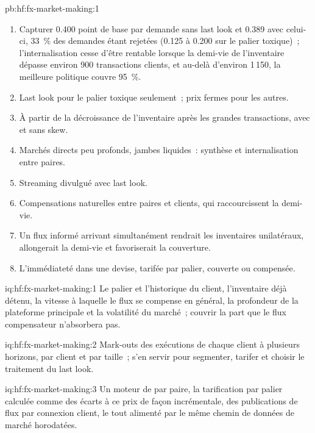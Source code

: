 \begin{solution}{pb:hf:fx-market-making:1}
\begin{enumerate}
\item Capturer 0.400 point de base par demande sans last look et 0.389 avec celui-ci, 33~\% des demandes étant rejetées (0.125 à 0.200 sur le palier toxique)~; l'internalisation cesse
d'être rentable lorsque la demi-vie de l'inventaire dépasse environ 900 transactions clients, et au-delà d'environ 1\,150, la meilleure politique couvre 95~\%.
\item Last look pour le palier toxique seulement~; prix fermes pour les autres.
\item À partir de la décroissance de l'inventaire après les grandes transactions, avec et sans skew.
\item Marchés directs peu profonds, jambes liquides~: synthèse et internalisation entre paires.
\item Streaming divulgué avec last look.
\item Compensations naturelles entre paires et clients, qui raccourcissent la demi-vie.
\item Un flux informé arrivant simultanément rendrait les inventaires unilatéraux, allongerait la demi-vie et favoriserait la couverture.
\item L'immédiateté dans une devise, tarifée par palier, couverte ou compensée.
\end{enumerate}
\end{solution}

\begin{solution}{iq:hf:fx-market-making:1}
Le palier et l'historique du client, l'inventaire déjà détenu, la vitesse à laquelle le flux se compense en général, la profondeur de la plateforme
principale et la volatilité du marché~; couvrir la part que le flux compensateur n'absorbera pas.
\end{solution}

\begin{solution}{iq:hf:fx-market-making:2}
Mark-outs des exécutions de chaque client à plusieurs horizons, par client et par taille~; s'en servir pour segmenter, tarifer et choisir le traitement du last look.
\end{solution}

\begin{solution}{iq:hf:fx-market-making:3}
Un moteur de  par paire, la tarification par palier calculée comme des écarts à ce prix de façon incrémentale, des publications de flux par connexion client, le tout alimenté par le
même chemin de données de marché horodatées.
\end{solution}

